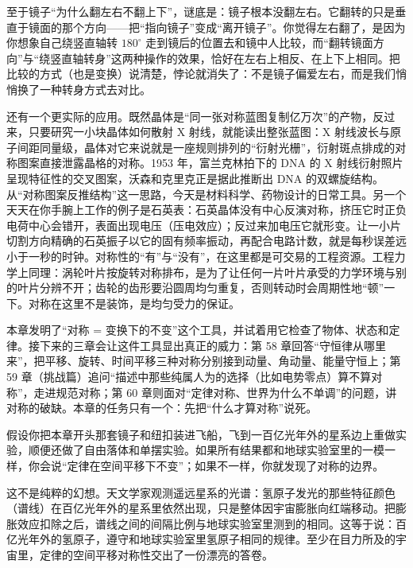 至于镜子“为什么翻左右不翻上下”，谜底是：镜子根本没翻左右。它翻转的只是垂直于镜面的那个方向——把“指向镜子”变成“离开镜子”。你觉得左右翻了，是因为你想象自己绕竖直轴转 \(180^\circ\) 走到镜后的位置去和镜中人比较，而“翻转镜面方向”与“绕竖直轴转身”这两种操作的效果，恰好在左右上相反、在上下上相同。把比较的方式（也是变换）说清楚，悖论就消失了：不是镜子偏爱左右，而是我们悄悄换了一种转身方式去对比。

还有一个更实际的应用。既然晶体是“同一张对称蓝图复制亿万次”的产物，反过来，只要研究一小块晶体如何散射 X 射线，就能读出整张蓝图：X 射线波长与原子间距同量级，晶体对它来说就是一座规则排列的“衍射光栅”，衍射斑点排成的对称图案直接泄露晶格的对称。1953 年，富兰克林拍下的 DNA 的 X 射线衍射照片呈现特征性的交叉图案，沃森和克里克正是据此推断出 DNA 的双螺旋结构。从“对称图案反推结构”这一思路，今天是材料科学、药物设计的日常工具。另一个天天在你手腕上工作的例子是石英表：石英晶体没有中心反演对称，挤压它时正负电荷中心会错开，表面出现电压（压电效应）；反过来加电压它就形变。让一小片切割方向精确的石英振子以它的固有频率振动，再配合电路计数，就是每秒误差远小于一秒的时钟。对称性的“有”与“没有”，在这里都是可交易的工程资源。工程力学上同理：涡轮叶片按旋转对称排布，是为了让任何一片叶片承受的力学环境与别的叶片分辨不开；齿轮的齿形要沿圆周均匀重复，否则转动时会周期性地“顿”一下。对称在这里不是装饰，是均匀受力的保证。


本章发明了“对称 = 变换下的不变”这个工具，并试着用它检查了物体、状态和定律。接下来的三章会让这件工具显出真正的威力：第 58 章回答“守恒律从哪里来”，把平移、旋转、时间平移三种对称分别接到动量、角动量、能量守恒上；第 59 章（挑战篇）追问“描述中那些纯属人为的选择（比如电势零点）算不算对称”，走进规范对称；第 60 章则面对“定律对称、世界为什么不单调”的问题，讲对称的破缺。本章的任务只有一个：先把“什么才算对称”说死。

\begin{thought}[搬到宇宙尽头去做实验]
假设你把本章开头那套镜子和纽扣装进飞船，飞到一百亿光年外的星系边上重做实验，顺便还做了自由落体和单摆实验。如果所有结果都和地球实验室里的一模一样，你会说“定律在空间平移下不变”；如果不一样，你就发现了对称的边界。

这不是纯粹的幻想。天文学家观测遥远星系的光谱：氢原子发光的那些特征颜色（谱线）在百亿光年外的星系里依然出现，只是整体因宇宙膨胀向红端移动。把膨胀效应扣除之后，谱线之间的间隔比例与地球实验室里测到的相同。这等于说：百亿光年外的氢原子，遵守和地球实验室里氢原子相同的规律。至少在目力所及的宇宙里，定律的空间平移对称性交出了一份漂亮的答卷。
\end{thought}

